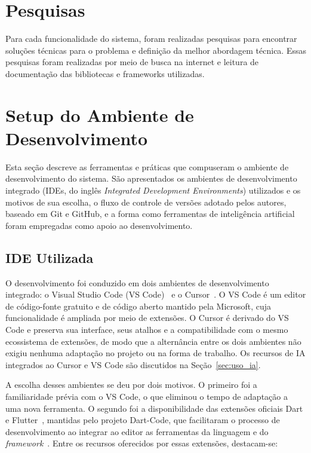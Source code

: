 \section{Pesquisas}

Para cada funcionalidade do sistema, foram realizadas pesquisas para encontrar soluções técnicas para o problema e definição da melhor abordagem técnica. Essas pesquisas foram realizadas por meio de busca na internet e leitura de documentação das bibliotecas e frameworks utilizadas.

\section{Setup do Ambiente de Desenvolvimento}

Esta seção descreve as ferramentas e práticas que compuseram o ambiente de desenvolvimento do sistema. São apresentados os ambientes de desenvolvimento integrado (\acrshort{IDE}s, do inglês \textit{Integrated Development Environments}) utilizados e os motivos de sua escolha, o fluxo de controle de versões adotado pelos autores, baseado em Git e GitHub, e a forma como ferramentas de inteligência artificial foram empregadas como apoio ao desenvolvimento.
    \subsection{IDE Utilizada}

O desenvolvimento foi conduzido em dois ambientes de desenvolvimento integrado: o Visual Studio Code (VS Code)~\cite{vscode_docs} e o Cursor~\cite{cursor_docs}. O VS Code é um editor de código-fonte gratuito e de código aberto mantido pela Microsoft, cuja funcionalidade é ampliada por meio de extensões. O Cursor é derivado do VS Code e preserva sua interface, seus atalhos e a compatibilidade com o mesmo ecossistema de extensões, de modo que a alternância entre os dois ambientes não exigiu nenhuma adaptação no projeto ou na forma de trabalho. Os recursos de \gls{IA} integrados ao Cursor e VS Code são discutidos na Seção~\ref{sec:uso_ia}.

A escolha desses ambientes se deu por dois motivos. O primeiro foi a familiaridade prévia com o VS Code, o que eliminou o tempo de adaptação a uma nova ferramenta. O segundo foi a disponibilidade das extensões oficiais Dart e Flutter~\cite{dart_code_vscode}, mantidas pelo projeto Dart-Code, que facilitaram o processo de desenvolvimento ao integrar ao editor as ferramentas da linguagem e do \textit{framework}~\cite{flutter_docs}. Entre os recursos oferecidos por essas extensões, destacam-se:

